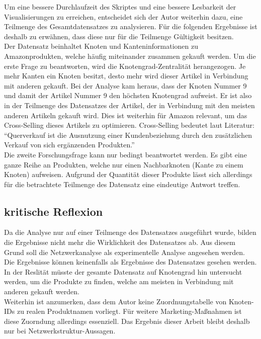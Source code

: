 \documentclass[
  12 pt,
]{article}
\begin{document}
Um eine bessere Durchlaufzeit des Skriptes und eine bessere Lesbarkeit
der Visualisierungen zu erreichen, entscheidet sich der Autor weiterhin
dazu, eine Teilmenge des Gesamtdatensatzes zu analysieren. Für die
folgenden Ergebnisse ist deshalb zu erwähnen, dass diese nur für die
Teilmenge Gültigkeit besitzen.\\
Der Datensatz beinhaltet Knoten und Kanteninformationen zu
Amazonprodukten, welche häufig miteinander zusammen gekauft werden. Um
die erste Frage zu beantworten, wird die Knotengrad-Zentralität
herangezogen. Je mehr Kanten ein Knoten besitzt, desto mehr wird dieser
Artikel in Verbindung mit anderen gekauft. Bei der Analyse kam heraus,
dass der Knoten Nummer 9 und damit der Artikel Nummer 9 den höchsten
Knotengrad aufweist. Er ist also in der Teilmenge des Datensatzes der
Artikel, der in Verbindung mit den meisten anderen Artikeln gekauft
wird. Dies ist weiterhin für Amazon relevant, um das Cross-Selling
dieses Artikels zu optimieren. Cross-Selling bedeutet laut Literatur:
``Querverkauf ist die Ausnutzung einer Kundenbeziehung durch den
zusätzlichen Verkauf von sich ergänzenden Produkten.''\\
Die zweite Forschungsfrage kann nur bedingt beantwortet werden. Es gibt
eine ganze Reihe an Produkten, welche nur einen Nachbarknoten (Kante zu
einem Knoten) aufweisen. Aufgrund der Quantität dieser Produkte lässt
sich allerdings für die betrachtete Teilmenge des Datensatz eine
eindeutige Antwort treffen.

\hypertarget{kritische-reflexion}{%
\subsection{kritische Reflexion}\label{kritische-reflexion}}

Da die Analyse nur auf einer Teilmenge des Datensatzes ausgeführt wurde,
bilden die Ergebnisse nicht mehr die Wirklichkeit des Datensatzes ab.
Aus diesem Grund soll die Netzwerkanalyse als experimentelle Analyse
angesehen werden. Die Ergebnisse können keinenfalls als Ergebnisse des
Datensatzes gesehen werden. In der Reslität müsste der gesamte Datensatz
auf Knotengrad hin untersucht werden, um die Produkte zu finden, welche
am meisten in Verbindung mit anderen gekauft werden.\\
Weiterhin ist anzumerken, dass dem Autor keine Zuordnungstabelle von
Knoten-IDs zu realen Produktnamen vorliegt. Für weitere
Marketing-Maßnahmen ist diese Zuorndung allerdings essenziell. Das
Ergebnis dieser Arbeit bleibt deshalb nur bei Netzwerkstruktur-Aussagen.
\end{document}
